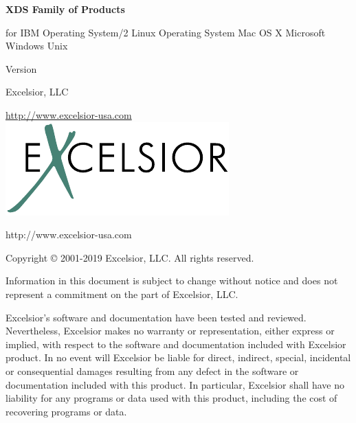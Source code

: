 %
%


\begin{titlepage}


\ifjava\else
\begin{center}
\Large\bf XDS Family of Products
\end{center}
\fi
\vspace{1 in}
\begin{center}
\Huge \bf
\ifcommon
\else
  \ProductName
  \par \Large for
  \ifosii       IBM Operating System/2
  \else\iflinux Linux Operating System
  \else\ifmacosx Mac OS X
  \else\ifwinnt Microsoft Windows 
  \else\ifunix  Unix
  \else\JNO
  \fi\fi\fi\fi\fi
  \par \Large Version \VersionNumber
  \vfill
\fi %
\end{center}
\begin{center}
\huge\bf \BookName{}
\end{center}

\vfill
\begin{center}
\ifonline
  {\Large Excelsior, LLC}

  \url{http://www.excelsior-usa.com}
\else
  \includegraphics[scale=0.7]{../Common/logo.pdf}

  {\sf http://www.excelsior-usa.com}
\fi

\end{center}

\pagebreak
\thispagestyle{empty}
\setcounter{page}{0}
{\small

Copyright \copyright{} 2001-2019 Excelsior, LLC. All rights reserved.

Information in this document is subject to change without notice and
does not represent a commitment on the part of Excelsior, LLC.

Excelsior's software and documentation have been tested and reviewed.
Nevertheless, Excelsior makes no warranty or representation,
either express or implied, with respect to the software and
documentation included with Excelsior product. In no event will Excelsior be
liable for direct, indirect, special, incidental or consequential
damages resulting from any defect in the software or
documentation included with this product. In particular, Excelsior
shall have no liability for any programs or data used with this
product, including the cost of recovering programs or data.

}
\end{titlepage}
